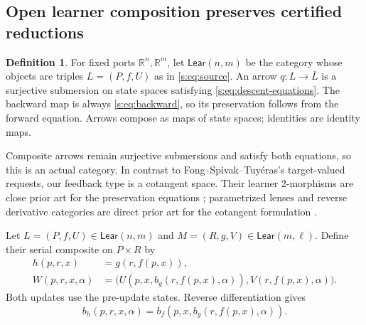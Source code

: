 \documentclass[11pt]{article}
\theoremstyle{definition}
\newtheorem{definition}[theorem]{Definition}
\theoremstyle{remark}\newtheorem{remark}[theorem]{Remark}
\newcommand{\R}{\mathbb R}
\newcommand{\Lear}{\mathsf{Lear}}
\begin{document}
\subsection{Open learner composition preserves certified reductions}
\begin{definition}
For fixed ports $\R^n,\R^m$, let $\Lear(n,m)$ be the category whose objects
are triples $L=(P,f,U)$ as in \eqref{s:eq:source}. An arrow
$q:L\to\bar L$ is a surjective submersion on state spaces satisfying
\eqref{s:eq:descent-equations}. The backward map is always
\eqref{s:eq:backward}, so its preservation follows from the forward equation.
Arrows compose as maps of state spaces; identities are identity maps.
\end{definition}
Composite arrows remain surjective submersions and satisfy both equations,
so this is an actual category. In contrast to Fong--Spivak--Tuy\'eras's
target-valued requests, our feedback type is a cotangent space. Their
learner 2-morphisms are close prior art for the preservation equations
\cite[Section VII-C]{FST}; parametrized lenses and reverse derivative
categories are direct prior art for the cotangent formulation
\cite{CGGWZ}.

Let $L=(P,f,U)\in\Lear(n,m)$ and $M=(R,g,V)\in\Lear(m,\ell)$. Define
their serial composite on $P\times R$ by
\begin{align}
 h(p,r,x)&=g(r,f(p,x)),\label{s:eq:serial-forward}\\
 W(p,r,x,\alpha)&=\bigl(
 U(p,x,b_g(r,f(p,x),\alpha)),
 V(r,f(p,x),\alpha)\bigr).\label{s:eq:serial-update}
\end{align}
Both updates use the pre-update states. Reverse differentiation gives
\begin{equation}\label{s:eq:serial-backward}
 b_h(p,r,x,\alpha)
   =b_f(p,x,b_g(r,f(p,x),\alpha)).
\end{equation}
\end{document}
